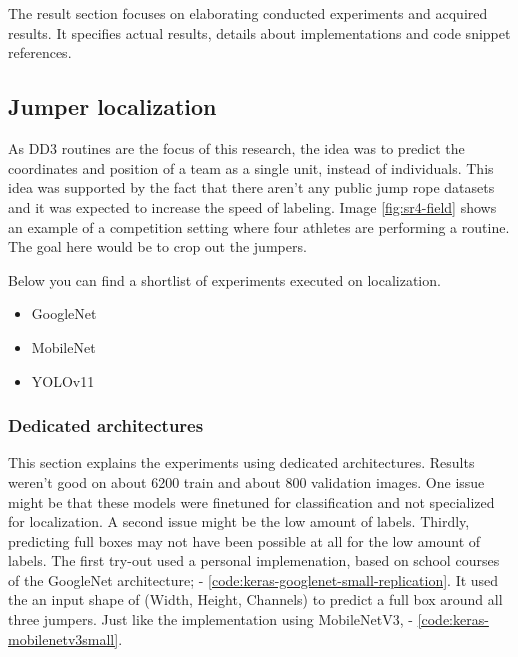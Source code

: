 
\chapter{}%
\label{ch:results}

The result section focuses on elaborating conducted experiments and acquired results. It specifies actual results, details about implementations and code snippet references.

\section{Jumper localization}
\label{results:jumper-localization}

As DD3 routines are the focus of this research, the idea was to predict the coordinates and position of a team as a single unit, instead of individuals. This idea was supported by the fact that there aren't any public jump rope datasets and it was expected to increase the speed of labeling. Image \ref{fig:sr4-field} shows an example of a competition setting where four athletes are performing a routine. The goal here would be to crop out the jumpers.


Below you can find a shortlist of experiments executed on localization.

\begin{itemize}
    \item GoogleNet
    \item MobileNet
    \item YOLOv11
\end{itemize}

\subsection{Dedicated architectures}

This section explains the experiments using dedicated architectures. Results weren't good on about 6200 train and about 800 validation images. One issue might be that these models were finetuned for classification and not specialized for localization. A second issue might be the low amount of labels. Thirdly, predicting full boxes may not have been possible at all for the low amount of labels.
The first try-out used a personal implemenation, based on school courses of the GoogleNet architecture; \autocite{Szegedy2014} - \ref{code:keras-googlenet-small-replication}.
It used the an input shape of (Width, Height, Channels) to predict a full box around all three jumpers. Just like the implementation using MobileNetV3, \autocite{Howard2019} - \ref{code:keras-mobilenetv3small}.

